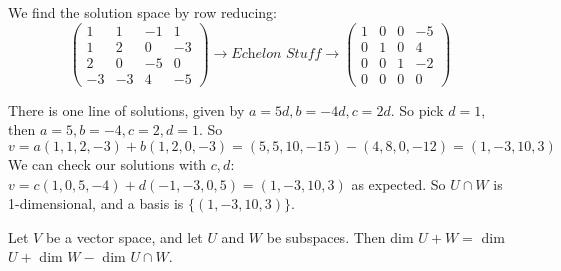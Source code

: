 \documentclass[10pt]{scrartcl}
\begin{document}
\begin{examples}
We find the solution space by row reducing:
\[
\begin{pmatrix}
1 & 1 & -1 & 1\\
1 & 2 & 0 & -3\\
2 & 0 & -5 & 0\\
-3 & -3 & 4 & -5
\end{pmatrix} \rightarrow \textit{Echelon Stuff} \rightarrow
 \begin{pmatrix}
 1 & 0 & 0 & -5\\
 0 & 1 & 0 & 4\\
 0 & 0 & 1 & -2\\
 0 & 0 & 0 & 0
 \end{pmatrix}  \]

There is one line of solutions, given by $a = 5d, b = -4d, c = 2d.$ So pick $d = 1$, then $a = 5, b = -4, c = 2, d =1$. So \[v = a(1,1,2,-3) + b(1,2,0,-3) = (5,5,10,-15) - (4,8,0,-12) = (1,-3,10,3)\]
We can check our solutions with $c,d$: $v = c(1,0,5,-4) + d(-1,-3,0,5) = (1,-3,10,3)$ as expected. So $U \cap W$ is 1-dimensional, and a basis is $\{(1,-3,10,3)\}$.
\end{examples}


\begin{theorem} Let $V$ be a vector space, and let $U$ and $W$ be subspaces. Then dim $U + W = $ dim $U + $ dim $W - $ dim $U \cap W$.	
\end{theorem}
\end{document}
